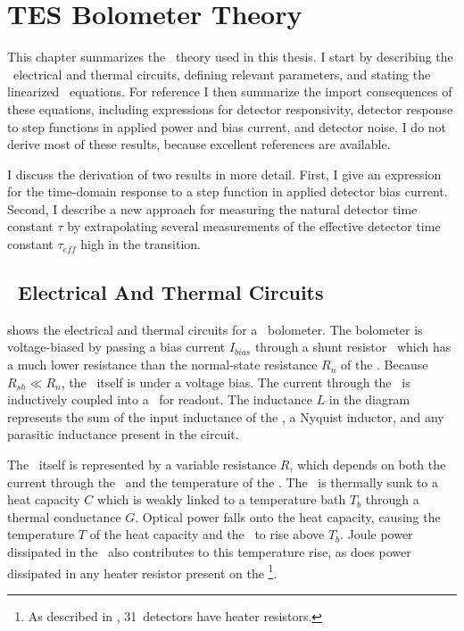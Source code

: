 \chapter{TES Bolometer Theory}\label{c:tes}

This chapter summarizes the \TES\ theory used in this thesis.
I start by describing the \TES\ electrical and thermal circuits, defining relevant parameters, and stating the linearized \TES\ equations.
For reference I then summarize the import consequences of these equations, including expressions for detector responsivity, detector response to step functions in applied power and bias current, and detector noise.
I do not derive most of these results, because excellent references are available\cite{irwin_application_1995,irwin_transition-edge_2005, mather_bolometer_1982}.

I discuss the derivation of two results in more detail.
First, I give an expression for the time-domain response to a step function in applied detector bias current.
Second, I describe a new approach for measuring the natural detector time constant $\tau$ by extrapolating several measurements of the effective detector time constant $\tau_{eff}$ high in the transition. 

\section{\TES\ Electrical And Thermal Circuits}

 shows the electrical and thermal circuits for a \TES\ bolometer.
The bolometer is voltage-biased by passing a bias current $I_{bias}$ through a shunt resistor \Rsh\ which has a much lower resistance than the normal-state resistance $R_n$ of the \TES.
Because $R_{sh} \ll R_n$, the \TES\ itself is under a voltage bias.
The current through the \TES\ is inductively coupled into a \SQUID\ for readout.
The inductance $L$ in the diagram represents the sum of the input inductance of the \SQUID, a Nyquist inductor, and any parasitic inductance present in the circuit.

The \TES\ itself is represented by a variable resistance $R$, which depends on both the current through the \TES\ and the temperature of the \TES.
The \TES\ is thermally sunk to a heat capacity $C$ which is weakly linked to a temperature bath $T_b$ through a thermal conductance $G$.
Optical power falls onto the heat capacity, causing the temperature $T$ of the heat capacity and the \TES\ to rise above $T_b$.
Joule power dissipated in the \TES\ also contributes to this temperature rise, as does power dissipated in any heater resistor present on the \TES\footnote{As described in , 31~detectors have heater resistors.}.

